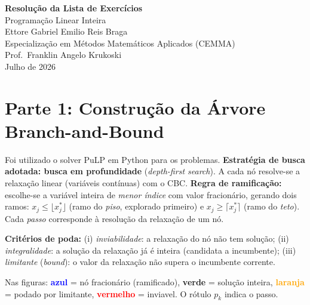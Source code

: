 \documentclass[11pt, a4paper]{article}
\begin{document}
\begin{titlepage}
\centering
\vspace*{4cm}
{\Large\textbf{Resolu\c{c}\~ao da Lista de Exerc\'icios}}\\[1em]
{\large Programa\c{c}\~ao Linear Inteira}\\[3cm]
{\normalsize Ettore Gabriel Emilio Reis Braga}\\[0.6em]
{\normalsize Especializa\c{c}\~ao em M\'etodos Matem\'aticos Aplicados (CEMMA)}\\[0.3em]
{\normalsize Prof.\ Franklin Angelo Krukoski}\\[3cm]
{\normalsize Julho de 2026}
\end{titlepage}

\newpage

\section{Parte 1: Constru\c{c}\~ao da \'Arvore Branch-and-Bound}
Foi utilizado o solver PuLP em Python para os problemas.
\textbf{Estrat\'egia de busca adotada: busca em profundidade} (\emph{depth-first
search}). A cada n\'o resolve-se a relaxa\c{c}\~ao linear (vari\'aveis cont\'inuas)
com o CBC. \textbf{Regra de ramifica\c{c}\~ao:} escolhe-se a vari\'avel inteira de
\emph{menor \'indice} com valor fracion\'ario, gerando dois ramos:
$x_j \le \lfloor x_j^* \rfloor$ (ramo do \emph{piso}, explorado primeiro) e
$x_j \ge \lceil x_j^* \rceil$ (ramo do \emph{teto}). Cada \emph{passo}
corresponde \`a resolu\c{c}\~ao da relaxa\c{c}\~ao de um n\'o.

\medskip
\noindent\textbf{Crit\'erios de poda:} (i) \emph{inviabilidade}: a relaxa\c{c}\~ao
do n\'o n\~ao tem solu\c{c}\~ao; (ii) \emph{integralidade}: a solu\c{c}\~ao da
relaxa\c{c}\~ao j\'a \'e inteira (candidata a incumbente); (iii) \emph{limitante}
(\emph{bound}): o valor da relaxa\c{c}\~ao n\~ao supera o incumbente corrente.

\medskip
\noindent Nas figuras: \textcolor{blue}{\textbf{azul}} = n\'o fracion\'ario
(ramificado), \textcolor{green!60!black}{\textbf{verde}} = solu\c{c}\~ao inteira,
\textcolor{orange}{\textbf{laranja}} = podado por limitante,
\textcolor{red}{\textbf{vermelho}} = inviavel. O r\'otulo $p_k$ indica o passo.
\end{document}
